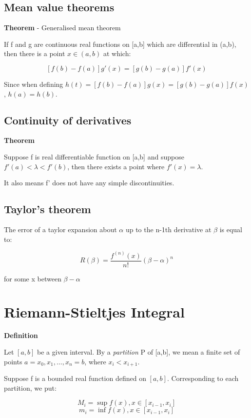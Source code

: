 \documentclass[11pt]{article}
\begin{document}
\subsection{Mean value theorems}
\label{sec:org7cc948b}

\textbf{Theorem} - Generalised mean theorem

If f and g are continuous real functions on [a,b] which are differential in (a,b), then there is a point \(x\in(a,b)\) at which:

\[
[f(b)-f(a)]g'(x) = [g(b)-g(a)]f'(x)
\]

Since when defining \(h(t) =[f(b)-f(a)]g(x) = [g(b)-g(a)]f(x)\), \(h(a) = h(b)\).

\subsection{Continuity of derivatives}
\label{sec:orgd4414cb}
\textbf{Theorem}

Suppose f is real differentiable function on [a,b] and suppose \(f'(a) < \lambda < f'(b)\), then there exists a point where \(f'(x) = \lambda\).

It also means f' does not have any simple discontinuities.

\subsection{Taylor's theorem}
\label{sec:orga0b398b}

The error of a taylor expansion about \(\alpha\) up to the n-1th derivative at \(\beta\) is equal to:

\[
R(\beta) = \frac{f^{(n)}(x)}{n!} (\beta - \alpha)^n
\]

for some x between \(\beta - \alpha\)

\section{Riemann-Stieltjes Integral}
\label{sec:org46b8aa4}

\textbf{Definition}

Let \([a,b]\) be a given interval. By a \emph{partition} P of [a,b], we mean a finite set of points \(a=x_0,x_1,\ldots,x_n=b\), where \(x_i < x_{i+1}\).


Suppose f is a bounded real function defined on \([a,b]\). Corresponding to each partition, we put:

\[
M_i = \sup f(x), x\in [x_{i-1},x_i]
\]
\[
m_i = \inf f(x), x\in [x_{i-1},x_i]
\]
\end{document}
